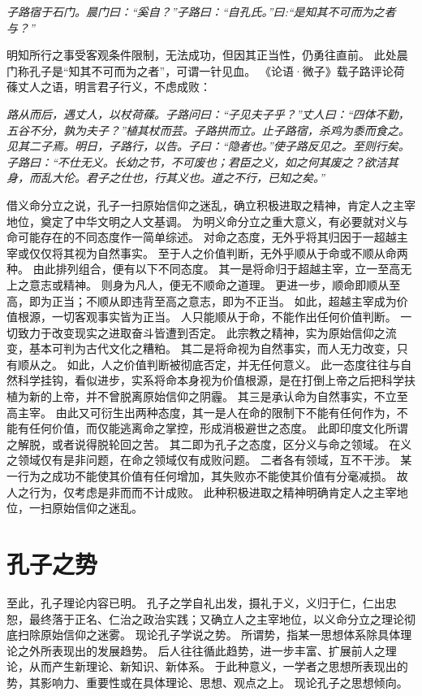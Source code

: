 \documentclass[11pt]{article}
\begin{document}
\textit{子路宿于石门。晨门曰：“奚自？”子路曰：“自孔氏。”曰:“是知其不可而为之者与？”}

明知所行之事受客观条件限制，无法成功，但因其正当性，仍勇往直前。
此处晨门称孔子是“知其不可而为之者”，可谓一针见血。
《论语·微子》载子路评论荷蓧丈人之语，明言君子行义，不虑成败：

\textit{路从而后，遇丈人，以杖荷蓧。子路问曰：“子见夫子乎？”丈人曰：“四体不勤，五谷不分，孰为夫子？”植其杖而芸。子路拱而立。止子路宿，杀鸡为黍而食之。见其二子焉。明日，子路行，以告。子曰：“隐者也。”使子路反见之。至则行矣。子路曰：“不仕无义。长幼之节，不可废也；君臣之义，如之何其废之？欲洁其身，而乱大伦。君子之仕也，行其义也。道之不行，已知之矣。”}

\par

借义命分立之说，孔子一扫原始信仰之迷乱，确立积极进取之精神，肯定人之主宰地位，奠定了中华文明之人文基调。
为明义命分立之重大意义，有必要就对义与命可能存在的不同态度作一简单综述。
对命之态度，无外乎将其归因于一超越主宰或仅仅将其视为自然事实。
至于人之价值判断，无外乎顺从于命或不顺从命两种。
由此排列组合，便有以下不同态度。
其一是将命归于超越主宰，立一至高无上之意志或精神。
则身为凡人，便无不顺命之道理。
更进一步，顺命即顺从至高，即为正当；不顺从即违背至高之意志，即为不正当。
如此，超越主宰成为价值根源，一切客观事实皆为正当。
人只能顺从于命，不能作出任何价值判断。
一切致力于改变现实之进取奋斗皆遭到否定。
此宗教之精神，实为原始信仰之流变，基本可判为古代文化之糟粕。
其二是将命视为自然事实，而人无力改变，只有顺从之。
如此，人之价值判断被彻底否定，并无任何意义。
此一态度往往与自然科学挂钩，看似进步，实系将命本身视为价值根源，是在打倒上帝之后把科学扶植为新的上帝，并不曾脱离原始信仰之阴霾。
其三是承认命为自然事实，不立至高主宰。
由此又可衍生出两种态度，其一是人在命的限制下不能有任何作为，不能有任何价值，而仅能逃离命之掌控，形成消极避世之态度。
此即印度文化所谓之解脱，或者说得脱轮回之苦。
其二即为孔子之态度，区分义与命之领域。
在义之领域仅有是非问题，在命之领域仅有成败问题。
二者各有领域，互不干涉。
某一行为之成功不能使其价值有任何增加，其失败亦不能使其价值有分毫减损。
故人之行为，仅考虑是非而而不计成败。
此种积极进取之精神明确肯定人之主宰地位，一扫原始信仰之迷乱。

\section{孔子之势}
至此，孔子理论内容已明。
孔子之学自礼出发，摄礼于义，义归于仁，仁出忠恕，最终落于正名、仁治之政治实践；又确立人之主宰地位，以义命分立之理论彻底扫除原始信仰之迷雾。
现论孔子学说之势。
所谓势，指某一思想体系除具体理论之外所表现出的发展趋势。
后人往往循此趋势，进一步丰富、扩展前人之理论，从而产生新理论、新知识、新体系。
于此种意义，一学者之思想所表现出的势，其影响力、重要性或在具体理论、思想、观点之上。
现论孔子之思想倾向。
\end{document}
